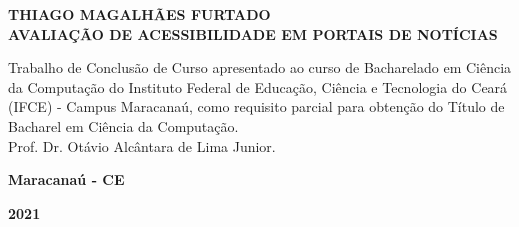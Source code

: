 \documentclass[a4paper]{article}
\begin{document}
\begin{titlepage}
	\vfill
	\begin{center}
		\onehalfspacing
		\fontsize{12pt}{0pt}\selectfont
		{\large \textbf{THIAGO MAGALHÃES FURTADO}} \\[1.5cm]
		\fontsize{12pt}{0pt}\selectfont
		{\large \textbf{AVALIAÇÃO DE ACESSIBILIDADE EM PORTAIS DE NOTÍCIAS}}\\[3cm]
		
		\hspace{.45\textwidth} %
		\begin{minipage}{.5\textwidth}
			\large Trabalho de Conclusão de Curso apresentado ao curso de Bacharelado em Ciência da Computação do Instituto Federal de Educação, Ciência e Tecnologia do Ceará (IFCE) - Campus Maracanaú, como requisito parcial para obtenção do Título de Bacharel em Ciência da Computação.\\[1cm]
			Prof. Dr. Otávio Alcântara de Lima Junior.
		\end{minipage}
		\vfill
		\vspace{2cm}		
		\large \textbf{Maracanaú - CE}
		
		\large \textbf{2021}
	\end{center}
\end{titlepage}
\end{document}
